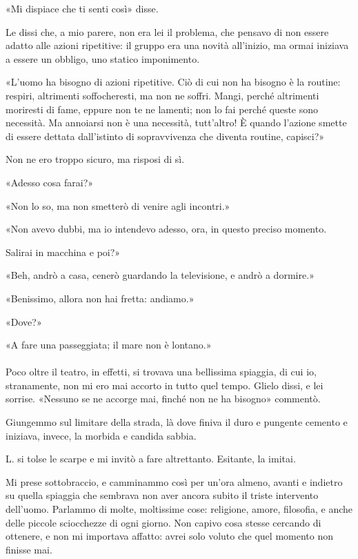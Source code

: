 \documentclass[a4paper,12pt]{book}
\begin{document}
«Mi dispiace che ti senti così» disse.

Le dissi che, a mio parere, non era lei il problema, che pensavo di non essere
adatto alle azioni ripetitive: il gruppo era una novità all’inizio, ma ormai
iniziava a essere un obbligo, uno statico imponimento.

«L’uomo ha bisogno di azioni ripetitive. Ciò di cui non ha bisogno è la
routine: respiri, altrimenti soffocheresti, ma non ne soffri. Mangi, perché
altrimenti moriresti di fame, eppure non te ne lamenti; non lo fai perché
queste sono necessità. Ma annoiarsi non è una necessità, tutt’altro! È
quando l’azione smette di essere dettata dall’istinto di sopravvivenza che
diventa routine, capisci?»

Non ne ero troppo sicuro, ma risposi di sì.

«Adesso cosa farai?»

«Non lo so, ma non smetterò di venire agli incontri.»

«Non avevo dubbi, ma io intendevo adesso, ora, in questo preciso momento.

Salirai in macchina e poi?»

«Beh, andrò a casa, cenerò guardando la televisione, e andrò a dormire.»

«Benissimo, allora non hai fretta: andiamo.»

«Dove?»

«A fare una passeggiata; il mare non è lontano.»

\paragraph{}
Poco oltre il teatro, in effetti, si trovava una bellissima spiaggia, di cui io,
stranamente, non mi ero mai accorto in tutto quel tempo. Glielo dissi, e lei
sorrise. «Nessuno se ne accorge mai, finché non ne ha bisogno» commentò.

Giungemmo sul limitare della strada, là dove finiva il duro e pungente cemento
e iniziava, invece, la morbida e candida sabbia.

L. si tolse le scarpe e mi invitò a fare altrettanto. Esitante, la imitai.

Mi prese sottobraccio, e camminammo così per un’ora almeno, avanti e indietro
su quella spiaggia che sembrava non aver ancora subito il triste intervento
dell’uomo. Parlammo di molte, moltissime cose: religione, amore, filosofia, e
anche delle piccole sciocchezze di ogni giorno. Non capivo cosa stesse cercando
di ottenere, e non mi importava affatto: avrei solo voluto che quel momento non
finisse mai.
\end{document}
